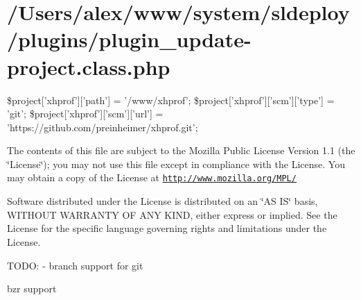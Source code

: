 \hypertarget{_2_users_2alex_2www_2system_2sldeploy_2plugins_2plugin_update-project_8class_8php-example}{
\section{/Users/alex/www/system/sldeploy/plugins/plugin\_\-update-\/project.class.php}
}
\$project\mbox{[}'xhprof'\mbox{]}\mbox{[}'path'\mbox{]} = '/www/xhprof'; \$project\mbox{[}'xhprof'\mbox{]}\mbox{[}'scm'\mbox{]}\mbox{[}'type'\mbox{]} = 'git'; \$project\mbox{[}'xhprof'\mbox{]}\mbox{[}'scm'\mbox{]}\mbox{[}'url'\mbox{]} = 'https://github.com/preinheimer/xhprof.git';

The contents of this file are subject to the Mozilla Public License Version 1.1 (the \char`\"{}License\char`\"{}); you may not use this file except in compliance with the License. You may obtain a copy of the License at \href{http://www.mozilla.org/MPL/}{\tt http://www.mozilla.org/MPL/}

Software distributed under the License is distributed on an \char`\"{}AS IS\char`\"{} basis, WITHOUT WARRANTY OF ANY KIND, either express or implied. See the License for the specific language governing rights and limitations under the License.

TODO: -\/ branch support for git
\begin{DoxyItemize}
\item bzr support
\end{DoxyItemize}


\begin{DoxyCodeInclude}
\end{DoxyCodeInclude}
 